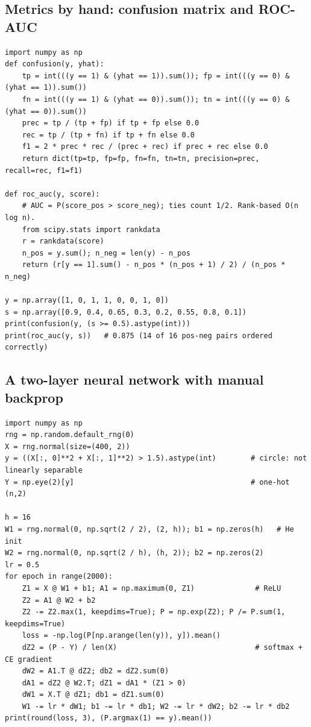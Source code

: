 \subsection{Metrics by hand: confusion matrix and ROC-AUC}
\begin{lstlisting}[style=python]
import numpy as np
def confusion(y, yhat):
    tp = int(((y == 1) & (yhat == 1)).sum()); fp = int(((y == 0) & (yhat == 1)).sum())
    fn = int(((y == 1) & (yhat == 0)).sum()); tn = int(((y == 0) & (yhat == 0)).sum())
    prec = tp / (tp + fp) if tp + fp else 0.0
    rec = tp / (tp + fn) if tp + fn else 0.0
    f1 = 2 * prec * rec / (prec + rec) if prec + rec else 0.0
    return dict(tp=tp, fp=fp, fn=fn, tn=tn, precision=prec, recall=rec, f1=f1)

def roc_auc(y, score):
    # AUC = P(score_pos > score_neg); ties count 1/2. Rank-based O(n log n).
    from scipy.stats import rankdata
    r = rankdata(score)
    n_pos = y.sum(); n_neg = len(y) - n_pos
    return (r[y == 1].sum() - n_pos * (n_pos + 1) / 2) / (n_pos * n_neg)

y = np.array([1, 0, 1, 1, 0, 0, 1, 0])
s = np.array([0.9, 0.4, 0.65, 0.3, 0.2, 0.55, 0.8, 0.1])
print(confusion(y, (s >= 0.5).astype(int)))
print(roc_auc(y, s))   # 0.875 (14 of 16 pos-neg pairs ordered correctly)
\end{lstlisting}

\subsection{A two-layer neural network with manual backprop}
\begin{lstlisting}[style=python]
import numpy as np
rng = np.random.default_rng(0)
X = rng.normal(size=(400, 2))
y = ((X[:, 0]**2 + X[:, 1]**2) > 1.5).astype(int)        # circle: not linearly separable
Y = np.eye(2)[y]                                         # one-hot (n,2)

h = 16
W1 = rng.normal(0, np.sqrt(2 / 2), (2, h)); b1 = np.zeros(h)   # He init
W2 = rng.normal(0, np.sqrt(2 / h), (h, 2)); b2 = np.zeros(2)
lr = 0.5
for epoch in range(2000):
    Z1 = X @ W1 + b1; A1 = np.maximum(0, Z1)              # ReLU
    Z2 = A1 @ W2 + b2
    Z2 -= Z2.max(1, keepdims=True); P = np.exp(Z2); P /= P.sum(1, keepdims=True)
    loss = -np.log(P[np.arange(len(y)), y]).mean()
    dZ2 = (P - Y) / len(X)                                # softmax + CE gradient
    dW2 = A1.T @ dZ2; db2 = dZ2.sum(0)
    dA1 = dZ2 @ W2.T; dZ1 = dA1 * (Z1 > 0)
    dW1 = X.T @ dZ1; db1 = dZ1.sum(0)
    W1 -= lr * dW1; b1 -= lr * db1; W2 -= lr * dW2; b2 -= lr * db2
print(round(loss, 3), (P.argmax(1) == y).mean())
\end{lstlisting}

